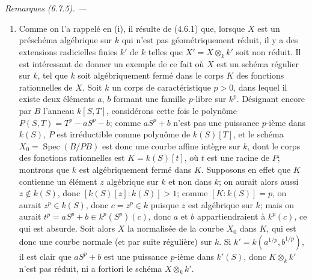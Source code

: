 \documentclass[10pt,oneside]{book}
\newcommand{\oldpage}[2][]{%
  \setcounter{footnote}{0}%
  \marginpar{\scriptsize\textbf{#1}~|~#2}\ignorespaces}
\newenvironment{remarks}[1][]{%
  \par\medskip\noindent\itshape Remarques (#1). ---\ }{\par}
\begin{document}
\begin{remarks}[6.7.5]
\begin{enumerate}
\oldpage[IV-2]{148}

\item[(ii)] Comme on l'a rappelé en (i), il résulte de (4.6.1) que,
lorsque $X$ est un préschéma algébrique sur $k$ qui n'est pas
géométriquement réduit, il y a des extensions radicielles finies $k'$ de
$k$ telles que $X'=X\otimes_k k'$ soit non réduit. Il est intéressant de
donner un exemple de ce fait où $X$ est un schéma régulier sur $k$, tel
que $k$ soit algébriquement fermé dans le corps $K$ des fonctions
rationnelles de $X$. Soit $k$ un corps de caractéristique $p>0$, dans
lequel il existe deux éléments $a$, $b$ formant une famille $p$-libre sur
$k^p$. Désignant encore par $B$ l'anneau $k[S,T]$, considérons cette fois
le polynôme $P(S,T)=T^p-aS^p-b$; comme $aS^p+b$ n'est pas une puissance
$p$-ième dans $k(S)$, $P$ est irréductible comme polynôme de $k(S)[T]$,
et le schéma $X_0=\operatorname{Spec}(B/PB)$ est donc une courbe affine
intègre sur $k$, dont le corps des fonctions rationnelles est
$K=k(S)[t]$, où $t$ est une racine de $P$; montrons que $k$ est
algébriquement fermé dans $K$. Supposons en effet que $K$ contienne un
élément $z$ algébrique sur $k$ et non dans $k$; on aurait alors aussi
$z\notin k(S)$, donc $[k(S)[z]:k(S)]>1$; comme $[K:k(S)]=p$, on aurait
$z^p\in k(S)$, donc $c=z^p\in k$ puisque $z$ est algébrique sur $k$;
mais on aurait $t^p=aS^p+b\in k^p(S^p)(c)$, donc $a$ et $b$
appartiendraient à $k^p(c)$, ce qui est absurde. Soit alors $X$ la
normalisée de la courbe $X_0$ dans $K$, qui est donc une courbe normale
(et par suite régulière) sur $k$. Si $k'=k(a^{1/p},b^{1/p})$, il est
clair que $aS^p+b$ est une puissance $p$-ième dans $k'(S)$, donc
$K\otimes_k k'$ n'est pas réduit, ni a fortiori le schéma
$X\otimes_k k'$.
\end{enumerate}
\end{remarks}
\end{document}
